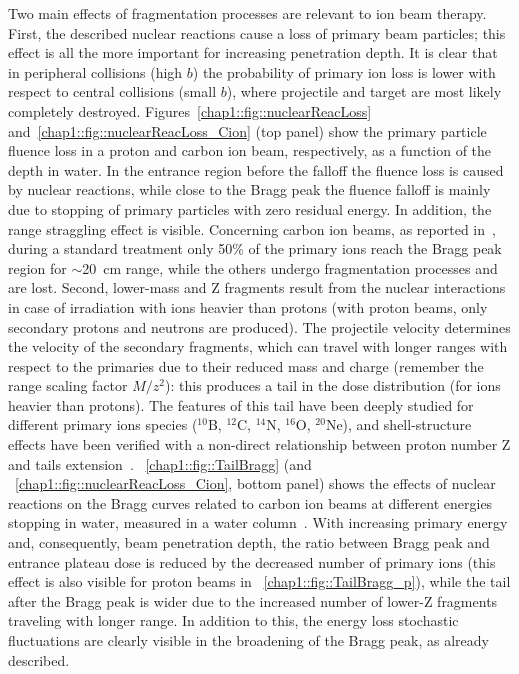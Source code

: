 Two main effects of fragmentation processes are relevant to ion beam therapy. 
First, the described nuclear reactions cause a loss of primary beam particles; this effect is all the more important for increasing penetration depth. It is clear that in peripheral collisions (high $b$) the probability of primary ion loss is lower with respect to central collisions (small $b$), where projectile and target are most likely completely destroyed. Figures~\ref{chap1::fig::nuclearReacLoss} and~\ref{chap1::fig::nuclearReacLoss_Cion} (top panel) show the primary particle fluence loss in a proton  and carbon ion beam, respectively, as a function of the depth in water. In the entrance region before the falloff the fluence loss is caused by nuclear reactions, while close to the Bragg peak the fluence falloff is mainly due to stopping of primary particles with zero residual energy. In addition, the range straggling effect is visible. Concerning carbon ion beams, as reported in~\cite{Durante2016}, during a standard treatment only 50\% of the primary ions reach the Bragg peak region for $\sim$20~cm range, while the others undergo fragmentation processes and are lost.
Second, lower-mass and Z fragments result from the nuclear interactions in case of irradiation with ions heavier than protons (with proton beams, only secondary protons and neutrons are produced).
The projectile velocity determines the velocity of the secondary fragments, which can travel with longer ranges with respect to the primaries due to their reduced mass and charge (remember the range scaling factor $M/z^{2}$): this produces a tail in the dose distribution (for ions heavier than protons). The features of this tail have been deeply studied for different primary ions species ($^{10}$B, $^{12}$C, $^{14}$N, $^{16}$O, $^{20}$Ne), and shell-structure effects have been verified with a non-direct relationship between proton number Z and tails extension~\parencite{Schall1996}.  \figurename~\ref{chap1::fig::TailBragg} (and \figurename~\ref{chap1::fig::nuclearReacLoss_Cion}, bottom panel) shows the effects of nuclear reactions on the Bragg curves related to carbon ion beams at different energies stopping in water, measured in a water column~\parencite{Schardt2008}. With increasing primary energy and, consequently, beam penetration depth, the ratio between Bragg peak and entrance plateau dose is reduced by the decreased number of primary ions (this effect is also visible for proton beams in \figurename~\ref{chap1::fig::TailBragg_p}), while the tail after the Bragg peak is wider due to the increased number of lower-Z fragments traveling with longer range. In addition to this, the energy loss stochastic fluctuations are clearly visible in the broadening of the Bragg peak, as already described.  

